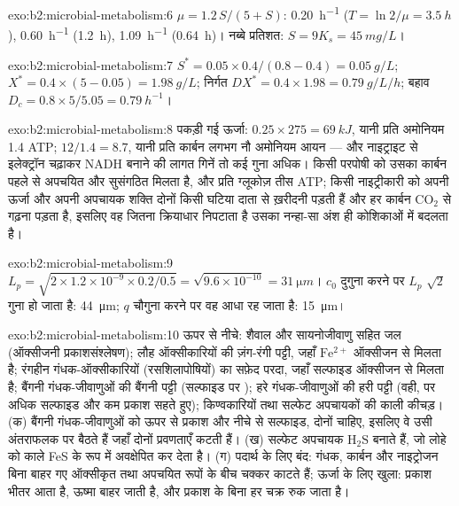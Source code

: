 \begin{solution}{exo:b2:microbial-metabolism:6}
$\mu = 1.2\,S/(5 + S)$: \qty{0.20}{h^{-1}} ($T = \ln 2/\mu =
\qty{3.5}{h}$), \qty{0.60}{h^{-1}} (\qty{1.2}{h}), \qty{1.09}{h^{-1}}
(\qty{0.64}{h})। नब्बे प्रतिशत: $S = 9K_s = \qty{45}{mg/L}$।
\end{solution}

\begin{solution}{exo:b2:microbial-metabolism:7}
$S^* = 0.05\times 0.4/(0.8 - 0.4) = \qty{0.05}{g/L}$; $X^* =
0.4\times(5 - 0.05) = \qty{1.98}{g/L}$; निर्गत $DX^* = 0.4\times
1.98 = \qty{0.79}{g/L/h}$; बहाव $D_c = 0.8\times 5/5.05 =
\qty{0.79}{h^{-1}}$।
\end{solution}

\begin{solution}{exo:b2:microbial-metabolism:8}
पकड़ी गई ऊर्जा: $0.25\times 275 = \qty{69}{kJ}$, यानी प्रति अमोनियम
1.4 ATP; $12/1.4 = 8.7$, यानी प्रति कार्बन लगभग नौ अमोनियम आयन --- और
नाइट्राइट से इलेक्ट्रॉन चढ़ाकर NADH बनाने की लागत गिनें तो कई गुना
अधिक। किसी परपोषी को उसका कार्बन पहले से अपचयित और सुसंगठित मिलता है,
और प्रति ग्लूकोज़ तीस ATP; किसी नाइट्रीकारी को अपनी ऊर्जा और अपनी
अपचायक शक्ति दोनों किसी घटिया दाता से ख़रीदनी पड़ती हैं और हर कार्बन
$\mathrm{CO_2}$ से गढ़ना पड़ता है, इसलिए वह जितना क्रियाधार निपटाता है
उसका नन्हा-सा अंश ही कोशिकाओं में बदलता है।
\end{solution}

\begin{solution}{exo:b2:microbial-metabolism:9}
$L_p = \sqrt{2\times 1.2\times 10^{-9}\times 0.2/0.5} =
\sqrt{9.6\times 10^{-10}} = \qty{31}{\micro m}$। $c_0$ दुगुना करने पर
$L_p$ $\sqrt 2$ गुना हो जाता है: \qty{44}{\micro m}; $q$ चौगुना करने
पर वह आधा रह जाता है: \qty{15}{\micro m}।
\end{solution}

\begin{solution}{exo:b2:microbial-metabolism:10}
ऊपर से नीचे: शैवाल और सायनोजीवाणु सहित जल (ऑक्सीजनी
प्रकाशसंश्लेषण); लौह ऑक्सीकारियों की ज़ंग-रंगी पट्टी, जहाँ $\mathrm{Fe^{2+}}$
ऑक्सीजन से मिलता है; रंगहीन गंधक-ऑक्सीकारियों
(रसशिलापोषियों) का सफ़ेद परदा, जहाँ सल्फाइड ऑक्सीजन से मिलता है;
बैंगनी गंधक-जीवाणुओं की बैंगनी पट्टी (सल्फाइड पर );
हरे गंधक-जीवाणुओं की हरी पट्टी (वही, पर अधिक सल्फाइड और
कम प्रकाश सहते हुए); किण्वकारियों तथा सल्फेट अपचायकों की काली कीचड़।
(क) बैंगनी गंधक-जीवाणुओं को ऊपर से प्रकाश और नीचे से सल्फाइड, दोनों
चाहिए, इसलिए वे उसी अंतराफलक पर बैठते हैं जहाँ दोनों प्रवणताएँ कटती
हैं। (ख) सल्फेट अपचायक $\mathrm{H_2S}$ बनाते हैं, जो लोहे को काले FeS
के रूप में अवक्षेपित कर देता है। (ग) पदार्थ के लिए बंद: गंधक, कार्बन
और नाइट्रोजन बिना बाहर गए ऑक्सीकृत तथा अपचयित रूपों के बीच चक्कर काटते
हैं; ऊर्जा के लिए खुला: प्रकाश भीतर आता है, ऊष्मा बाहर जाती है, और
प्रकाश के बिना हर चक्र रुक जाता है।
\end{solution}

